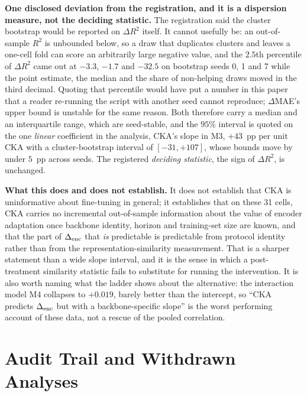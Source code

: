 \textbf{One disclosed deviation from the registration, and it is a dispersion
measure, not the deciding statistic.}  The registration said the cluster bootstrap
would be reported on $\Delta R^2$ itself.  It cannot usefully be: an out-of-sample
$R^2$ is unbounded below, so a draw that duplicates clusters and leaves a one-cell
fold can score an arbitrarily large negative value, and the $2.5$th percentile of
$\Delta R^2$ came out at $-3.3$, $-1.7$ and $-32.5$ on bootstrap seeds 0, 1 and 7
while the point estimate, the median and the share of non-helping draws moved in
the third decimal.  Quoting that percentile would have put a number in this paper
that a reader re-running the script with another seed cannot reproduce; $\Delta$MAE's
upper bound is unstable for the same reason.  Both therefore carry a median and an
interquartile range, which are seed-stable, and the $95\%$ interval is quoted on the
one \emph{linear} coefficient in the analysis, CKA's slope in M3, $+43$~pp per unit
CKA with a cluster-bootstrap interval of $[-31, +107]$, whose bounds move by under
$5$~pp across seeds.  The registered \emph{deciding statistic}, the sign of
$\Delta R^2$, is unchanged.



\textbf{What this does and does not establish.}  It does not establish that CKA is
uninformative about fine-tuning in general; it establishes that on these 31 cells,
CKA carries no incremental out-of-sample information about the value of encoder
adaptation once backbone identity, horizon and training-set size are known, and
that the part of $\Delta_\text{enc}$ that \emph{is} predictable is predictable from protocol
identity rather than from the representation-similarity measurement.  That is a
sharper statement than a wide slope interval, and it is the sense in which a
post-treatment similarity statistic fails to substitute for running the
intervention.  It is also worth naming what the ladder shows about the alternative:
the interaction model M4 collapses to $+0.019$, barely better than the intercept,
so ``CKA predicts $\Delta_\text{enc}$ but with a backbone-specific slope'' is the worst
performing account of these data, not a rescue of the pooled correlation.

\section{Audit Trail and Withdrawn Analyses}
\label{app:audit}

